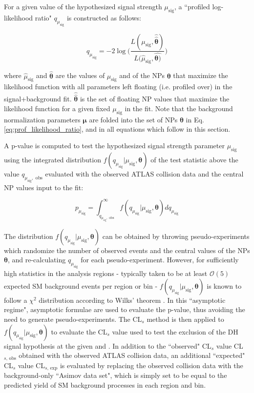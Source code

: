 For a given value of the hypothesized signal strength \(\mu_\text{sig}\), a ``profiled log-likelihood ratio" \(q_{\mu_\text{sig}}\) is constructed as follows:

\begin{equation}
\label{eq:prof_likelihood_ratio}
q_{\mu_\text{sig}} = -2\log\Bigg( \frac{L(\mu_\text{sig}, \hat{\hat{\boldsymbol{\theta}}})}{L(\hat{\mu}_\text{sig}, \hat{\boldsymbol{\theta})}} \Bigg)
\end{equation}

\noindent where \(\hat{\mu}_\text{sig}\) and \(\hat{\boldsymbol{\theta}}\) are the values of \(\mu_\text{sig}\) and of the NPs \(\boldsymbol{\theta}\) that maximize the likelihood function with all parameters left floating (i.e. profiled over) in the signal+background fit. \(\hat{\hat{\boldsymbol{\theta}}}\) is the set of floating NP values that maximize the likelihood function for a given fixed \(\mu_\text{sig}\) in the fit. Note that the background normalization parameters \(\boldsymbol{\mu}\) are folded into the set of NPs \(\boldsymbol{\theta}\) in Eq. 
\ref{eq:prof_likelihood_ratio}, and in all equations which follow in this section.

A p-value is computed to test the hypothesized signal strength parameter \(\mu_\text{sig}\) using the integrated distribution \(f(q_{\mu_\text{sig}}|\mu_\text{sig}, \boldsymbol{\theta})\) of the test statistic above the value \(q_{\mu_\text{sig},\text{ obs}}\) evaluated with the observed ATLAS collision data and the central NP values input to the fit:

\begin{equation}
\label{eq:pvalue}
p_{\mu_\text{sig}} = \int_{q_{\mu_\text{sig},\text{ obs}}}^\infty f(q_{\mu_\text{sig}}|\mu_\text{sig}, \boldsymbol{\theta})dq_{\mu_\text{sig}}
\end{equation}

The distribution \(f(q_{\mu_\text{sig}}|\mu_\text{sig}, \boldsymbol{\theta})\) can be obtained by throwing pseudo-experiments which randomize the number of observed events and the central values of the NPs \(\boldsymbol{\theta}\), and re-calculating \(q_{\mu_\text{sig}}\) for each pseudo-experiment. However, for sufficiently high statistics in the analysis regions - typically taken to be at least \(\mathcal{O}(5)\) expected SM background events per region or bin - \(f(q_{\mu_\text{sig}}|\mu_\text{sig}, \boldsymbol{\theta})\) is known to follow a \(\chi^2\) distribution according to Wilks' theorem \cite{Wilks_1938}. In this ``asymptotic regime", asymptotic formulae \cite{Cowan_2011} are used to evaluate the p-value, thus avoiding the need to generate pseudo-experiments. The CL\(_s\) method \cite{Read_2002} is then applied to \(f(q_{\mu_\text{sig}}|\mu_\text{sig}, \boldsymbol{\theta})\) to evaluate the CL\(_s\) value used to test the exclusion of the DH signal hypothesis at the given \ms and \mZp. In addition to the ``observed" CL\(_s\) value CL\(_{s\text{, obs}}\) obtained with the observed ATLAS collision data, an additional ``expected" CL\(_s\) value CL\(_{s\text{, exp}}\) is evaluated by replacing the observed collision data with the background-only ``Asimov data set", which is simply set to be equal to the predicted yield of SM background processes in each region and bin.

